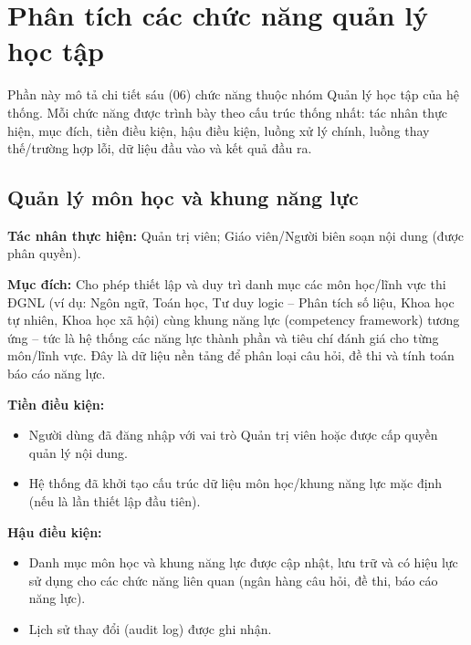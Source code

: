 \documentclass[12pt,a4paper]{article}
\newcommand{\ucfield}[2]{\noindent\textbf{#1: } #2\par\vspace{0.35em}}
\begin{document}
	\newpage
	\section{Phân tích các chức năng quản lý học tập}
	
	Phần này mô tả chi tiết sáu (06) chức năng thuộc nhóm Quản lý học tập của hệ thống. Mỗi chức năng được trình bày theo cấu trúc thống nhất: tác nhân thực hiện, mục đích, tiền điều kiện, hậu điều kiện, luồng xử lý chính, luồng thay thế/trường hợp lỗi, dữ liệu đầu vào và kết quả đầu ra.
	
	\subsection{Quản lý môn học và khung năng lực}
	
	\ucfield{Tác nhân thực hiện}{Quản trị viên; Giáo viên/Người biên soạn nội dung (được phân quyền).}
	
	\ucfield{Mục đích}{Cho phép thiết lập và duy trì danh mục các môn học/lĩnh vực thi ĐGNL (ví dụ: Ngôn ngữ, Toán học, Tư duy logic -- Phân tích số liệu, Khoa học tự nhiên, Khoa học xã hội) cùng khung năng lực (competency framework) tương ứng -- tức là hệ thống các năng lực thành phần và tiêu chí đánh giá cho từng môn/lĩnh vực. Đây là dữ liệu nền tảng để phân loại câu hỏi, đề thi và tính toán báo cáo năng lực.}
	
	\ucfield{Tiền điều kiện}{
		\begin{itemize}[nosep]
			\item Người dùng đã đăng nhập với vai trò Quản trị viên hoặc được cấp quyền quản lý nội dung.
			\item Hệ thống đã khởi tạo cấu trúc dữ liệu môn học/khung năng lực mặc định (nếu là lần thiết lập đầu tiên).
	\end{itemize}}
	
	\ucfield{Hậu điều kiện}{
		\begin{itemize}[nosep]
			\item Danh mục môn học và khung năng lực được cập nhật, lưu trữ và có hiệu lực sử dụng cho các chức năng liên quan (ngân hàng câu hỏi, đề thi, báo cáo năng lực).
			\item Lịch sử thay đổi (audit log) được ghi nhận.
	\end{itemize}}
	
\end{document}
